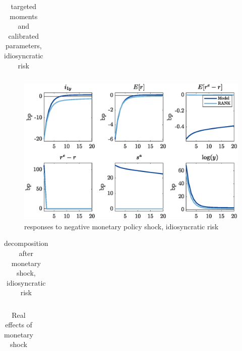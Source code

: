 \documentclass[12pt]{article}
\begin{document}

\begin{table}[H]
\centering
\bgroup
\def\arraystretch{1.25}
\begin{tabular}{clclcc} \hline

\end{tabular}
\egroup
\renewcommand\thetable{A.VI}
\caption{targeted moments and calibrated parameters, idiosyncratic risk}
\end{table}

\begin{figure}[H]
\centering
\includegraphics[width=\textwidth,clip=true,trim=0 20 0 10]{../output/figures/idio_compact_fig}
\renewcommand\thefigure{A.6}
\caption{responses to negative monetary policy shock, idiosyncratic risk}
\end{figure}

\vspace{20pt}

\begin{table}[H]
\centering
\bgroup
\def\arraystretch{1.25}
\begin{tabular}{lC{35mm}C{18mm}C{17mm}} \hline

\end{tabular}
\egroup
\renewcommand\thetable{A.VII}
\caption{decomposition after monetary shock, idiosyncratic risk}
\end{table}

\vspace{10pt}

\begin{table}[H]
\centering
\bgroup
\def\arraystretch{1.25}
\begin{tabular}{lC{18mm}C{18mm}C{25mm}} \hline

\end{tabular}
\egroup
\caption*{Real effects of monetary shock}
\end{table}
\end{document}
